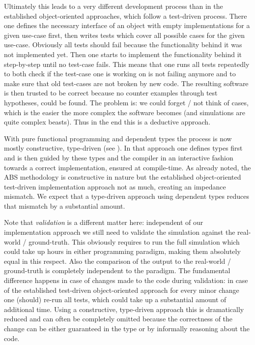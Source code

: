 Ultimately this leads to a very different development process than in the established object-oriented approaches, which follow a test-driven process. There one defines the necessary interface of an object with empty implementations for a given use-case first, then writes tests which cover all possible cases for the given use-case. Obviously all tests should fail because the functionality behind it was not implemented yet. Then one starts to implement the functionality behind it  step-by-step until no test-case fails. This means that one runs all tests repeatedly to both check if the test-case one is working on is not failing anymore and to make sure that old test-cases are not broken by new code. The resulting software is then trusted to be correct because no counter examples through test hypotheses, could be found. The problem is: we could forget / not think of cases, which is the easier the more complex the software becomes (and simulations are quite complex beasts). Thus in the end this is a deductive approach.

With pure functional programming and dependent types the process is now mostly constructive, type-driven (see \cite{brady_type-driven_2017}). In that approach one defines types first and is then guided by these types and the compiler in an interactive fashion towards a correct implementation, ensured at compile-time. As already noted, the ABS methodology is constructive in nature but the established object-oriented test-driven implementation approach not as much, creating an impedance mismatch. We expect that a type-driven approach using dependent types reduces that mismatch by a substantial amount.

Note that \textit{validation} is a different matter here: independent of our implementation approach we still need to validate the simulation against the real-world / ground-truth. This obviously requires to run the full simulation which could take up hours in either programming paradigm, making them absolutely equal in this respect. Also the comparison of the output to the real-world / ground-truth is completely independent to the paradigm. The fundamental difference happens in case of changes made to the code during validation: in case of the established test-driven object-oriented approach for every minor change one (should) re-run all tests, which could take up a substantial amount of additional time. Using a constructive, type-driven approach this is dramatically reduced and can often be completely omitted because the correctness of the change can be either guaranteed in the type or by informally reasoning about the code.

